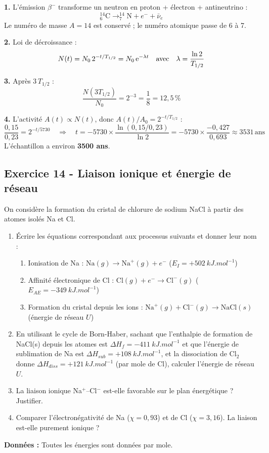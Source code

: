 \documentclass[12pt,a4paper]{article}
\begin{document}
\begin{boitecorrige}
\textbf{1.} L'émission $\beta^-$ transforme un neutron en proton + électron + antineutrino :
\[
^{14}_6\text{C} \to ^{14}_7\text{N} + e^- + \bar{\nu}_e
\]
Le numéro de masse $A=14$ est conservé ; le numéro atomique passe de 6 à 7.

\textbf{2.} Loi de décroissance :
\[
N(t) = N_0\,2^{-t/T_{1/2}} = N_0\,\mathrm{e}^{-\lambda t} \quad \text{avec}\quad \lambda = \frac{\ln 2}{T_{1/2}}
\]

\textbf{3.} Après $3\,T_{1/2}$ :
\[
\frac{N(3T_{1/2})}{N_0} = 2^{-3} = \frac{1}{8} = 12{,}5\,\%
\]

\textbf{4.} L'activité $A(t) \propto N(t)$, donc $A(t)/A_0 = 2^{-t/T_{1/2}}$ :
\[
\frac{0{,}15}{0{,}23} = 2^{-t/5730} \quad \Rightarrow \quad t = -5730\times\frac{\ln(0{,}15/0{,}23)}{\ln 2} = -5730\times\frac{-0{,}427}{0{,}693} \approx 3531\,\text{ans}
\]
L'échantillon a environ \textbf{3500 ans}.
\end{boitecorrige}


\subsection*{Exercice 14 - Liaison ionique et énergie de réseau \niveau{\moyen}}

\begin{boiteexercice}
On considère la formation du cristal de chlorure de sodium NaCl à partir des atomes isolés Na et Cl.

\begin{enumerate}
  \item Écrire les équations correspondant aux processus suivants et donner leur nom :
    \begin{enumerate}[label=(\alph*)]
      \item Ionisation de Na : $\text{Na}(g) \to \text{Na}^+(g) + e^-$ \quad ($E_I = +\qty{502}{kJ.mol^{-1}}$)
      \item Affinité électronique de Cl : $\text{Cl}(g) + e^- \to \text{Cl}^-(g)$ \quad ($E_{AE} = -\qty{349}{kJ.mol^{-1}}$)
      \item Formation du cristal depuis les ions : $\text{Na}^+(g) + \text{Cl}^-(g) \to \text{NaCl}(s)$ \quad (énergie de réseau $U$)
    \end{enumerate}
  \item En utilisant le cycle de Born-Haber, sachant que l'enthalpie de formation de NaCl(s) depuis les atomes est $\Delta H_f = -\qty{411}{kJ.mol^{-1}}$ et que l'énergie de sublimation de Na est $\Delta H_{sub} = +\qty{108}{kJ.mol^{-1}}$, et la dissociation de Cl$_2$ donne $\Delta H_{diss} = +\qty{121}{kJ.mol^{-1}}$ (par mole de Cl), calculer l'énergie de réseau $U$.
  \item La liaison ionique Na$^+$--Cl$^-$ est-elle favorable sur le plan énergétique ? Justifier.
  \item Comparer l'électronégativité de Na ($\chi = 0{,}93$) et de Cl ($\chi = 3{,}16$). La liaison est-elle purement ionique ?
\end{enumerate}

\textbf{Données :} Toutes les énergies sont données par mole.
\end{boiteexercice}
\end{document}
